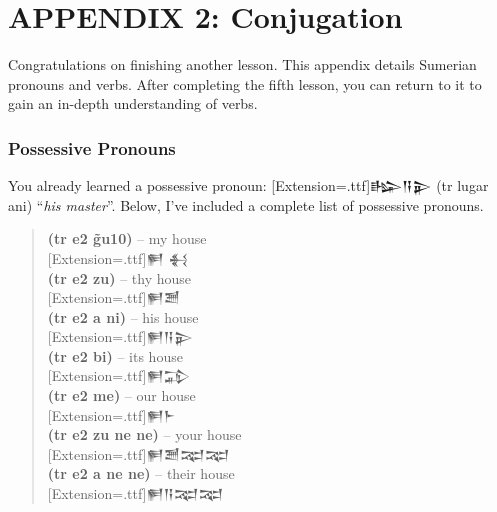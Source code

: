 \documentclass[a4paper,12pt]{book}
\newcommand{\fcn}{\setmainfont{Akkadian}[Extension=.ttf]}
\newcommand{\fcm}{\large\setmainfont{Akkadian}[Extension=.ttf]}
\newcommand{\fsm}{\Large\setmainfont{Akkadian}[Extension=.ttf]}
\begin{document}
\chapter*{APPENDIX 2: Conjugation}

Congratulations on finishing another
lesson. This appendix
details Sumerian pronouns and verbs.
After completing the fifth lesson, you can return
to it  to gain an in-depth
understanding of verbs.

\subsection*{Possessive Pronouns}
You already learned a possessive pronoun:
{\fcn 𒈗𒀀𒉌} (tr lugar ani) ``{\em his master}''.
Below, I've included a complete list of
possessive pronouns.
\begin{quotation}
\noindent
{\bf (tr e2 g̃u10)} -- my house\\
{\fcm 𒂍 𒈬}\\

\noindent
{\bf (tr e2 zu)} -- thy house\\
{\fcm 𒂍𒍪}\\

\noindent
{\bf (tr e2 a ni)} -- his house\\
{\fcm 𒂍𒀀𒉌}\\

\noindent
{\bf (tr e2 bi)} -- its house\\
{\fcm 𒂍𒁉}\\

\noindent
{\bf (tr e2 me)} -- our house\\
{\fcm 𒂍𒈨}\\

\noindent
{\bf (tr e2 zu ne ne)} -- your house\\
{\fcm 𒂍𒍪𒉈𒉈}\\

\noindent
{\bf (tr e2 a ne ne)} -- their house\\
{\fsm 𒂍𒀀𒉈𒉈}\\
\end{quotation}

\newpage
\end{document}
